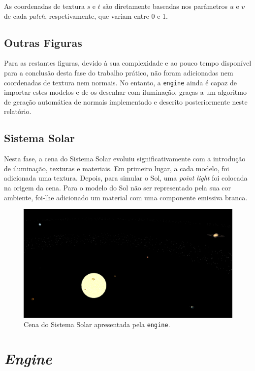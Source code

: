 \documentclass[12pt, a4paper]{article}
\begin{document}
As coordenadas de textura $s$ e $t$ são diretamente baseadas nos parâmetros $u$ e $v$ de cada
\emph{patch}, respetivamente, que variam entre 0 e 1.

\subsection{Outras Figuras}

Para as restantes figuras, devido à sua complexidade e ao pouco tempo disponível para a conclusão
desta fase do trabalho prático, não foram adicionadas nem coordenadas de textura nem normais. No
entanto, a \texttt{engine} ainda é capaz de importar estes modelos e de os desenhar com iluminação,
graças a um algoritmo de geração automática de normais implementado e descrito posteriormente neste
relatório.

\subsection{Sistema Solar}

Nesta fase, a cena do Sistema Solar evoluiu significativamente com a introdução de iluminação,
texturas e materiais. Em primeiro lugar, a cada modelo, foi adicionada uma textura. Depois, para
simular o Sol, uma \emph{point light} foi colocada na origem da cena. Para o modelo do Sol não ser
representado pela sua cor ambiente, foi-lhe adicionado um material com uma componente emissiva
branca.

\begin{figure}[H]
    \centering
    \includegraphics[width=\textwidth]{res/phase4/SolarSystem.png}
    \caption{Cena do Sistema Solar apresentada pela \texttt{engine}.}
\end{figure}

\section{\emph{Engine}}
\end{document}
